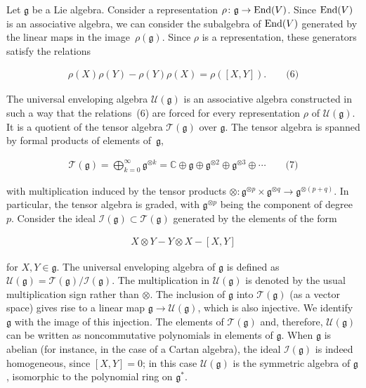 Let $\mathfrak{g}$ be a Lie algebra. Consider a representation $\rho\colon\mathfrak{g}\to\textnormal{End}(V)$.
Since $\textnormal{End}(V)$ is an associative algebra, we can consider the subalgebra of $\textnormal{End}(V)$ generated by the linear maps in the image $\rho(\mathfrak{g})$.
Since $\rho$ is a representation, these generators satisfy the relations



\[\begin{aligned}
\rho(X)\rho(Y)-\rho(Y)\rho(X)=\rho([X,Y]).\qquad\text{(6)}
\end{aligned}\]




The universal enveloping algebra $\mathcal{U}(\mathfrak{g})$ is an associative algebra constructed in such a way that the relations (6) are forced for every representation $\rho$ of $\mathcal{U}(\mathfrak{g})$.
It is a quotient of the tensor algebra $\mathcal{T}(\mathfrak{g})$ over $\mathfrak{g}$. The tensor algebra is spanned by formal products of elements of $\mathfrak{g}$,



\[\begin{aligned}
\displaystyle\mathcal{T}(\mathfrak{g})=\bigoplus_{k=0}^{\infty}\mathfrak{g}^{\otimes k}=\mathbb{C}\oplus\mathfrak{g}\oplus\mathfrak{g}^{\otimes 2}\oplus\mathfrak{g}^{\otimes 3}\oplus\cdots\qquad\text{(7)}
\end{aligned}\]


with multiplication induced by the tensor products $\otimes\colon\mathfrak{g}^{\otimes p}\times\mathfrak{g}^{\otimes q}\to\mathfrak{g}^{\otimes(p+q)}$. In particular, the tensor algebra is graded, with $\mathfrak{g}^{\otimes p}$ being the component of degree $p$. Consider the ideal $\mathcal{I}(\mathfrak{g})\subset\mathcal{T}(\mathfrak{g})$ generated by the elements of the form



\[\begin{aligned}
X\otimes Y-Y\otimes X-[X,Y]
\end{aligned}\]


for $X,Y\in\mathfrak{g}$.
The universal enveloping algebra of $\mathfrak{g}$ is defined as $\mathcal{U}(\mathfrak{g})=\mathcal{T}(\mathfrak{g})/\mathcal{I}(\mathfrak{g})$.
The multiplication in $\mathcal{U}(\mathfrak{g})$ is denoted by the usual multiplication sign rather than $\otimes$.
The inclusion of $\mathfrak{g}$ into $\mathcal{T}(\mathfrak{g})$ (as a vector space) gives rise to a linear map $\mathfrak{g}\to\mathcal{U}(\mathfrak{g})$, which is also injective.
We identify $\mathfrak{g}$ with the image of this injection.
The elements of $\mathcal{T}(\mathfrak{g})$ and, therefore, $\mathcal{U}(\mathfrak{g})$ can be written as noncommutative polynomials in elements of $\mathfrak{g}$. When $\mathfrak{g}$ is abelian (for instance, in the case of a Cartan algebra), the ideal $\mathcal{I}(\mathfrak{g})$ is indeed homogeneous, since $[X,Y]=0$; in this case $\mathcal{U}(\mathfrak{g})$ is the symmetric algebra of $\mathfrak{g}$, isomorphic to the polynomial ring on $\mathfrak{g}^{*}$.





